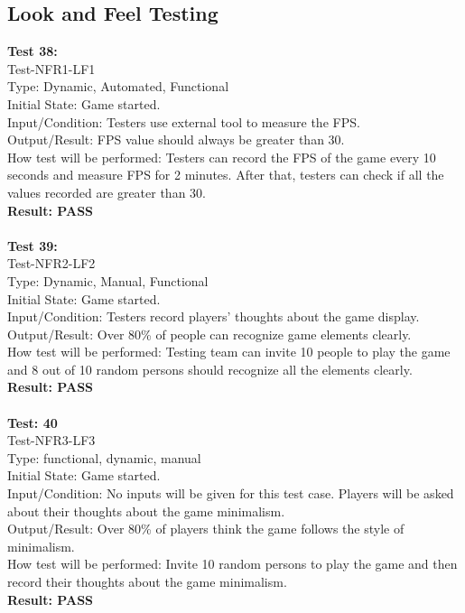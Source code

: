 \documentclass[12pt, titlepage]{article}
\begin{document}
\subsection{Look and Feel Testing}

\textbf{Test 38: }\\
Test-NFR1-LF1\\
Type: Dynamic, Automated, Functional\\
Initial State: Game started.\\
Input/Condition: Testers use external tool to measure
 the FPS.\\
Output/Result: FPS value should always be greater than
30.\\
How test will be performed: Testers can record the FPS
of the game every 10 seconds and measure FPS for 2
minutes. After that, testers can check if all the 
values recorded are greater than 30.\\
\textbf{Result: PASS}\\\\
\textbf{Test 39:}\\
Test-NFR2-LF2\\
Type: Dynamic, Manual, Functional\\
Initial State: Game started.\\
Input/Condition: Testers record players' thoughts about 
the game display.\\
Output/Result: Over 80\% of people can recognize 
game elements clearly.\\ 
How test will be performed: Testing team
can invite 10 people to play the game and
8 out of 10 random persons should recognize all the elements clearly.\\
\textbf{Result: PASS}\\\\
\textbf{Test: 40}\\
Test-NFR3-LF3\\
Type: functional, dynamic, manual\\
Initial State: Game started.\\
Input/Condition: No inputs will be given for this 
test case. Players will be asked about their thoughts
about the game minimalism.\\
Output/Result: Over 80\% of players think the game
follows the style of minimalism.\\
How test will be performed: Invite 10 random persons to
play the game and then record their thoughts about the
game minimalism.\\
\textbf{Result: PASS}\\\\
\end{document}
